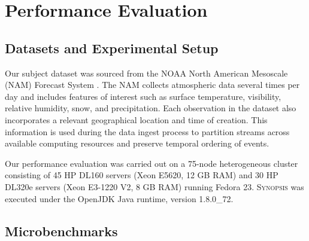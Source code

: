 \section{Performance Evaluation}
\label{sec:performance}

\subsection{Datasets and Experimental Setup}
Our subject dataset was sourced from the NOAA North American Mesoscale (NAM) Forecast System \cite{noaa_nam}.  The NAM collects atmospheric data several times per day and includes features of interest such as surface temperature, visibility, relative humidity, snow, and precipitation. Each observation in the dataset also incorporates a relevant geographical location and time of creation. This information is used during the data ingest process to partition streams across available computing resources and preserve temporal ordering of events.

Our performance evaluation was carried out on a 75-node heterogeneous cluster consisting of 45 HP DL160 servers (Xeon E5620, 12 GB RAM) and 30 HP DL320e servers (Xeon E3-1220 V2, 8 GB RAM) running Fedora 23. \textsc{Synopsis} was executed under the OpenJDK Java runtime, version 1.8.0\_72.

\subsection{Microbenchmarks}
